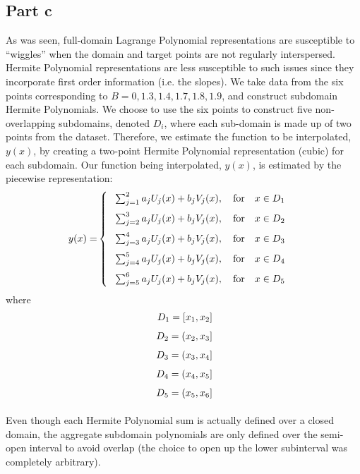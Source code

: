 \documentclass[11pt]{article}
\begin{document}
\subsection*{Part c}
As was seen, full-domain Lagrange Polynomial representations are susceptible to ``wiggles'' when the domain and target points are not regularly interspersed. Hermite Polynomial representations are less susceptible to such issues since they incorporate first order information (i.e. the slopes). We take data from the six points corresponding to $B = 0, 1.3, 1.4, 1.7, 1.8, 1.9$, and construct subdomain Hermite Polynomials. We choose to use the six points to construct five non-overlapping subdomains, denoted $D_i$, where each sub-domain is made up of two points from the dataset. Therefore, we estimate the function to be interpolated, $y(x)$, by creating a two-point Hermite Polynomial representation (cubic) for each subdomain. Our function being interpolated, $y(x)$, is estimated by the piecewise representation:
\begin{align}
    y(x) =
    &\left\{\;
        \begin{array}{r@{\;}l}
            \sum^2_{j=1} a_j U_j(x) + b_j V_j(x), \quad \text{for} \quad x \in D_1\\[0.1in]
            \sum^3_{j=2} a_j U_j(x) + b_j V_j(x), \quad \text{for}\quad x \in D_2\\[0.1in]
            \sum^4_{j=3} a_j U_j(x) + b_j V_j(x), \quad \text{for}\quad x \in D_3\\[0.1in]
            \sum^5_{j=4} a_j U_j(x) + b_j V_j(x), \quad \text{for} \quad x \in D_4\\[0.1in]
            \sum^6_{j=5} a_j U_j(x) + b_j V_j(x), \quad \text{for} \quad x \in D_5 \label{eq:hermite_polynomial}
        \end{array}
    \right.
\end{align}
where
\begin{align}
    \begin{array}{r@{\;}l}
        D_1 = [x_1, x_2]\\[0.1in]
        D_2 = (x_2, x_3]\\[0.1in]
        D_3 = (x_3, x_4]\\[0.1in]
        D_4 = (x_4, x_5]\\[0.1in]
        D_5 = (x_5, x_6]\\[0.1in]
    \end{array}
\end{align}
Even though each Hermite Polynomial sum is actually defined over a closed domain, the aggregate subdomain polynomials are only defined over the semi-open interval to avoid overlap (the choice to open up the lower subinterval was completely arbitrary).
\end{document}
